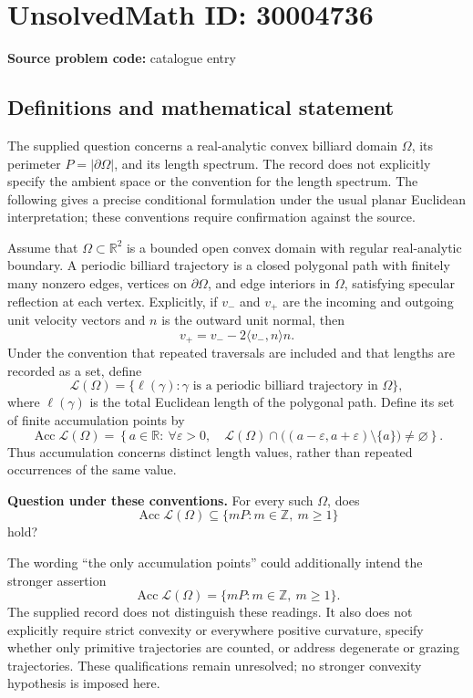 \documentclass[11pt]{article}
\newcommand{\Z}{\mathbb{Z}}
\newcommand{\R}{\mathbb{R}}
\begin{document}
\section*{UnsolvedMath ID: 30004736}
\textbf{Source problem code:} catalogue entry
\subsection{Definitions and mathematical statement}
The supplied question concerns a real-analytic convex billiard domain \(\Omega\), its perimeter \(P=|\partial\Omega|\), and its length spectrum. The record does not explicitly specify the ambient space or the convention for the length spectrum. The following gives a precise conditional formulation under the usual planar Euclidean interpretation; these conventions require confirmation against the source.

Assume that \(\Omega\subset\R^2\) is a bounded open convex domain with regular real-analytic boundary. A periodic billiard trajectory is a closed polygonal path with finitely many nonzero edges, vertices on \(\partial\Omega\), and edge interiors in \(\Omega\), satisfying specular reflection at each vertex. Explicitly, if \(v_-\) and \(v_+\) are the incoming and outgoing unit velocity vectors and \(n\) is the outward unit normal, then
\[
 v_+=v_- -2\langle v_-,n\rangle n.
\]
Under the convention that repeated traversals are included and that lengths are recorded as a set, define
\[
\mathcal L(\Omega)=\{\ell(\gamma):\gamma\text{ is a periodic billiard trajectory in }\Omega\},
\]
where \(\ell(\gamma)\) is the total Euclidean length of the polygonal path. Define its set of finite accumulation points by
\[
\operatorname{Acc}\mathcal L(\Omega)
=\left\{a\in\R:\ \forall\varepsilon>0,\quad
\mathcal L(\Omega)\cap\bigl((a-\varepsilon,a+\varepsilon)\setminus\{a\}\bigr)\ne\varnothing\right\}.
\]
Thus accumulation concerns distinct length values, rather than repeated occurrences of the same value.

\textbf{Question under these conventions.} For every such \(\Omega\), does
\[
\operatorname{Acc}\mathcal L(\Omega)
\subseteq \{mP:m\in\Z,\ m\ge 1\}
\]
hold?

The wording ``the only accumulation points'' could additionally intend the stronger assertion
\[
\operatorname{Acc}\mathcal L(\Omega)
=\{mP:m\in\Z,\ m\ge 1\}.
\]
The supplied record does not distinguish these readings. It also does not explicitly require strict convexity or everywhere positive curvature, specify whether only primitive trajectories are counted, or address degenerate or grazing trajectories. These qualifications remain unresolved; no stronger convexity hypothesis is imposed here.
\end{document}
